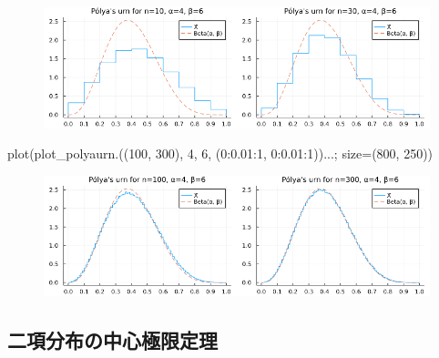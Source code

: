 \documentclass[
  letterpaper,
  DIV=11,
  numbers=noendperiod]{scrartcl}
\newenvironment{Shaded}{\begin{snugshade}}{\end{snugshade}}
\newcommand{\FloatTok}[1]{\textcolor[rgb]{0.68,0.00,0.00}{#1}}
\newcommand{\FunctionTok}[1]{\textcolor[rgb]{0.28,0.35,0.67}{#1}}
\newcommand{\NormalTok}[1]{\textcolor[rgb]{0.00,0.23,0.31}{#1}}
\newcommand{\OperatorTok}[1]{\textcolor[rgb]{0.37,0.37,0.37}{#1}}
\begin{document}
\begin{figure}[H]

{\centering \includegraphics{05 Central limit theorem_files/figure-pdf/cell-22-output-1.png}

}

\end{figure}

\begin{Shaded}
\begin{Highlighting}[]
\FunctionTok{plot}\NormalTok{(}\FunctionTok{plot\_polyaurn}\NormalTok{.((}\FloatTok{100}\NormalTok{, }\FloatTok{300}\NormalTok{), }\FloatTok{4}\NormalTok{, }\FloatTok{6}\NormalTok{, (}\FloatTok{0}\OperatorTok{:}\FloatTok{0.01}\OperatorTok{:}\FloatTok{1}\NormalTok{, }\FloatTok{0}\OperatorTok{:}\FloatTok{0.01}\OperatorTok{:}\FloatTok{1}\NormalTok{))}\OperatorTok{...}\NormalTok{; size}\OperatorTok{=}\NormalTok{(}\FloatTok{800}\NormalTok{, }\FloatTok{250}\NormalTok{))}
\end{Highlighting}
\end{Shaded}

\begin{figure}[H]

{\centering \includegraphics{05 Central limit theorem_files/figure-pdf/cell-23-output-1.png}

}

\end{figure}

\hypertarget{ux4e8cux9805ux5206ux5e03ux306eux4e2dux5fc3ux6975ux9650ux5b9aux7406}{%
\subsection{二項分布の中心極限定理}\label{ux4e8cux9805ux5206ux5e03ux306eux4e2dux5fc3ux6975ux9650ux5b9aux7406}}
\end{document}
